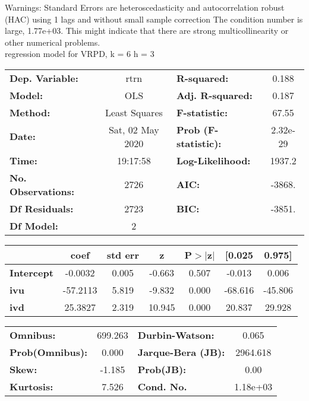 Warnings: \newline
 [1] Standard Errors are heteroscedasticity and autocorrelation robust (HAC) using 1 lags and without small sample correction \newline
 [2] The condition number is large, 1.77e+03. This might indicate that there are \newline
 strong multicollinearity or other numerical problems.\\ 

regression model for VRPD, k = 6 h = 3\begin{center}
\begin{tabular}{lclc}
\toprule
\textbf{Dep. Variable:}    &       rtrn       & \textbf{  R-squared:         } &     0.188   \\
\textbf{Model:}            &       OLS        & \textbf{  Adj. R-squared:    } &     0.187   \\
\textbf{Method:}           &  Least Squares   & \textbf{  F-statistic:       } &     67.55   \\
\textbf{Date:}             & Sat, 02 May 2020 & \textbf{  Prob (F-statistic):} &  2.32e-29   \\
\textbf{Time:}             &     19:17:58     & \textbf{  Log-Likelihood:    } &    1937.2   \\
\textbf{No. Observations:} &        2726      & \textbf{  AIC:               } &    -3868.   \\
\textbf{Df Residuals:}     &        2723      & \textbf{  BIC:               } &    -3851.   \\
\textbf{Df Model:}         &           2      & \textbf{                     } &             \\
\bottomrule
\end{tabular}
\begin{tabular}{lcccccc}
                   & \textbf{coef} & \textbf{std err} & \textbf{z} & \textbf{P$> |$z$|$} & \textbf{[0.025} & \textbf{0.975]}  \\
\midrule
\textbf{Intercept} &      -0.0032  &        0.005     &    -0.663  &         0.507        &       -0.013    &        0.006     \\
\textbf{ivu}       &     -57.2113  &        5.819     &    -9.832  &         0.000        &      -68.616    &      -45.806     \\
\textbf{ivd}       &      25.3827  &        2.319     &    10.945  &         0.000        &       20.837    &       29.928     \\
\bottomrule
\end{tabular}
\begin{tabular}{lclc}
\textbf{Omnibus:}       & 699.263 & \textbf{  Durbin-Watson:     } &    0.065  \\
\textbf{Prob(Omnibus):} &   0.000 & \textbf{  Jarque-Bera (JB):  } & 2964.618  \\
\textbf{Skew:}          &  -1.185 & \textbf{  Prob(JB):          } &     0.00  \\
\textbf{Kurtosis:}      &   7.526 & \textbf{  Cond. No.          } & 1.18e+03  \\
\bottomrule
\end{tabular}
\end{center}

